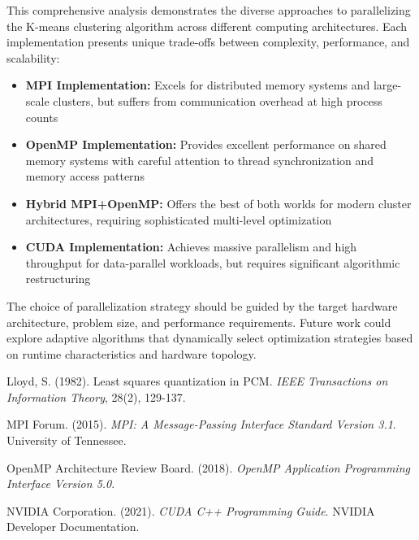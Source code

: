 \documentclass[12pt,a4paper]{article}
\begin{document}
This comprehensive analysis demonstrates the diverse approaches to parallelizing the K-means clustering algorithm across different computing architectures. Each implementation presents unique trade-offs between complexity, performance, and scalability:

\begin{itemize}
\item \textbf{MPI Implementation:} Excels for distributed memory systems and large-scale clusters, but suffers from communication overhead at high process counts
\item \textbf{OpenMP Implementation:} Provides excellent performance on shared memory systems with careful attention to thread synchronization and memory access patterns  
\item \textbf{Hybrid MPI+OpenMP:} Offers the best of both worlds for modern cluster architectures, requiring sophisticated multi-level optimization
\item \textbf{CUDA Implementation:} Achieves massive parallelism and high throughput for data-parallel workloads, but requires significant algorithmic restructuring
\end{itemize}

The choice of parallelization strategy should be guided by the target hardware architecture, problem size, and performance requirements. Future work could explore adaptive algorithms that dynamically select optimization strategies based on runtime characteristics and hardware topology.


\begin{thebibliography}{9}
Lloyd, S. (1982). Least squares quantization in PCM. \emph{IEEE Transactions on Information Theory}, 28(2), 129-137.

MPI Forum. (2015). \emph{MPI: A Message-Passing Interface Standard Version 3.1}. University of Tennessee.

OpenMP Architecture Review Board. (2018). \emph{OpenMP Application Programming Interface Version 5.0}. 

NVIDIA Corporation. (2021). \emph{CUDA C++ Programming Guide}. NVIDIA Developer Documentation.
\end{thebibliography}
\end{document}
